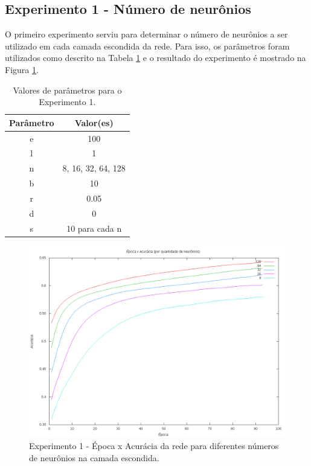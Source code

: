 \documentclass[12pt]{article}
\begin{document}
\subsection{Experimento 1 - Número de neurônios}

O primeiro experimento serviu para determinar o número de neurônios a ser
utilizado em cada camada escondida da rede. Para isso, os parâmetros
foram utilizados como descrito na Tabela \ref{tab:exp1} e o resultado
do experimento é mostrado na Figura \ref{fig:exp1}.

\begin{table}[h]
	\centering
	\begin{tabular}{|c|c|}
		\hline
		\textbf{Parâmetro} & \textbf{Valor(es)} \\ \hline
		e & 100 \\ \hline
		l & 1 \\ \hline
		n & 8, 16, 32, 64, 128 \\ \hline
		b & 10 \\ \hline
		r & 0.05 \\ \hline
		d & 0 \\ \hline
		s & 10 para cada n \\ \hline
	\end{tabular}
	\caption{\label{tab:exp1} Valores de parâmetros para o Experimento
	1.}
\end{table}

\begin{figure}[h]
  \centering
  \includegraphics[width=1\textwidth]{../tests/1-neurons/graph.png}
  \caption{Experimento 1 - Época x Acurácia da rede para diferentes
  números de neurônios na camada escondida.}
  \label{fig:exp1}
\end{figure}
\end{document}
